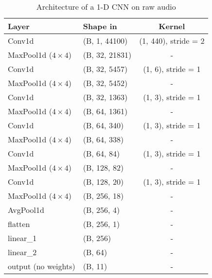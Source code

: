 \begin{table}[H]
\small
\centering
\begin{tabular}{l l c}
Layer                    & Shape in                   & Kernel \\ \hline
Conv1d                   & (B, 1, 44100)            & (1, 440), stride = 2          \\
MaxPool1d ($4 \times 4$) & (B, 32, 21831)            & -          \\
Conv1d                   & (B, 32, 5457)            & (1, 6), stride = 1          \\
MaxPool1d ($4 \times 4$) & (B, 32, 5452)            & -          \\
Conv1d                   & (B, 32, 1363)            & (1, 3), stride = 1          \\
MaxPool1d ($4 \times 4$) & (B, 64, 1361)            & -          \\
Conv1d                   & (B, 64, 340)            & (1, 3), stride = 1          \\
MaxPool1d ($4 \times 4$) & (B, 64, 338)            & -          \\
Conv1d                   & (B, 64, 84)            & (1, 3), stride = 1          \\
MaxPool1d ($4 \times 4$) & (B, 128, 82)            & -          \\
Conv1d                   & (B, 128, 20)            & (1, 3), stride = 1          \\
MaxPool1d ($4 \times 4$) & (B, 256, 18)            & -          \\
AvgPool1d                & (B, 256, 4)             & -          \\
flatten                  & (B, 256, 1)              & - \\
linear\_1                & (B, 256)                 & -          \\
linear\_2                & (B, 64)                 & -          \\
output (no weights)      & (B, 11)                  & - 
\end{tabular}
\caption{Architecture of a 1-D CNN on raw audio}
\label{tab:architecture-1d-cnn-raw-audio}
\end{table}

